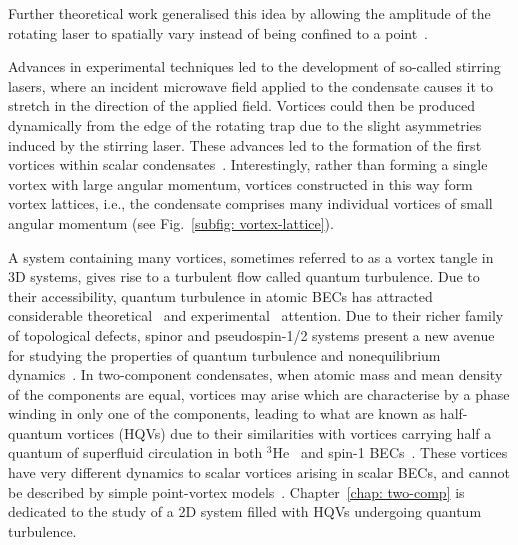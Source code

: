 Further theoretical work generalised this idea by allowing the amplitude of the
rotating laser to spatially vary instead of being confined to a
point~\cite{Ruostekoski2000}.

Advances in experimental techniques led to the development of so-called stirring
lasers, where an incident microwave field applied to the condensate causes
it to stretch in the direction of the applied field.
Vortices could then be produced dynamically from the edge of the rotating trap
due to the slight asymmetries induced by the stirring laser.
These advances led to the formation of the first vortices within scalar
condensates~\cite{Madison2000, Madison2000a, Abo-Shaeer2001}.
Interestingly, rather than forming a single vortex with large angular momentum,
vortices constructed in this way form vortex lattices, i.e., the condensate
comprises many individual vortices of small angular momentum (see
Fig.~\ref{subfig: vortex-lattice}).

A system containing many vortices, sometimes referred to as a vortex tangle
in 3D systems, gives rise to a turbulent flow called quantum turbulence.
Due to their accessibility, quantum turbulence in atomic BECs has attracted
considerable theoretical~\cite{Kobayashi2007,Numasato2010, Reeves2013,
Billam2014,Simula2014,Baggaley2018} and experimental~\cite{Henn2009,Kwon2014,
Seo2017,Navon2019,Gauthier2019,Johnstone2019} attention.
Due to their richer family of topological defects, spinor and pseudospin-1/2
systems present a new avenue for studying the properties of quantum turbulence
and nonequilibrium dynamics~\cite{Salman2009, Schmied2019, Karl2013, Prufer2018,
Hofmann2014}.
In two-component condensates, when atomic mass and mean density of the
components are equal, vortices may arise which are characterise by a phase
winding in only one of the components, leading to what are known as half-quantum
vortices (HQVs) due to their similarities with vortices carrying half a quantum
of superfluid circulation in both \(^3\)He~\cite{Autti2016} and
spin-1 BECs~\cite{Leonhardt2000, Seo2015}.
These vortices have very different dynamics to scalar vortices arising in scalar
BECs, and cannot be described by simple point-vortex models~\cite{Eto2011,
Kasamatsu2016}.
Chapter~\ref{chap: two-comp} is dedicated to the study of a 2D system filled
with HQVs undergoing quantum turbulence.

